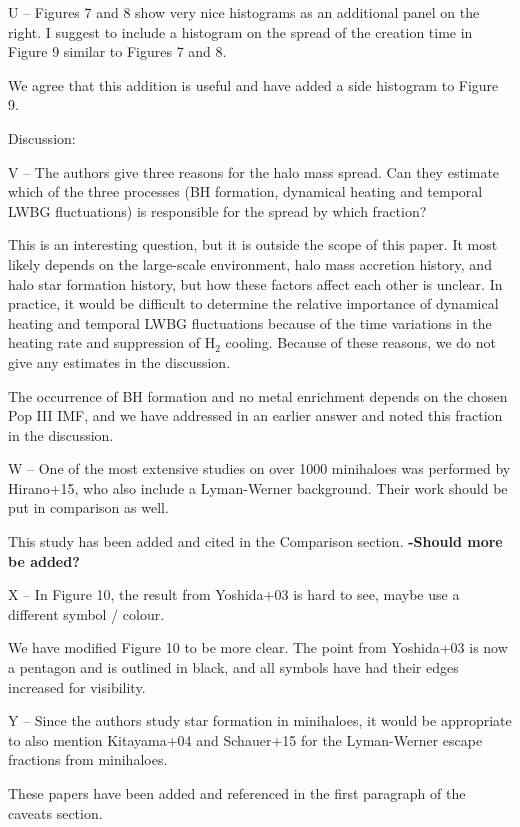 \documentclass[11pt]{article}
\newenvironment{referee}[1][]{%
    \ignorespaces%
    \begin{mdframed}[style=myquotestyle,#1]%
}{%
    \end{mdframed}%
    \ignorespacesafterend%
}%
\begin{document}
\begin{referee}
U -- Figures 7 and 8 show very nice histograms as an additional panel on the right.  I suggest to include a histogram on the spread of the creation time in Figure 9 similar to Figures 7 and 8.
\end{referee}
We agree that this addition is useful and have added a side histogram to Figure 9. 

\begin{referee}
Discussion:

V -- The authors give three reasons for the halo mass spread. Can they estimate which of the three processes (BH formation, dynamical heating and temporal LWBG fluctuations) is responsible for the spread by which fraction?
\end{referee}

This is an interesting question, but it is outside the scope of this paper.  It most likely depends on the large-scale environment, halo mass accretion history, and halo star formation history, but how these factors affect each other is unclear.  In practice, it would be difficult to determine the relative importance of dynamical heating and temporal LWBG fluctuations because of the time variations in the heating rate and suppression of H$_2$ cooling.  Because of these reasons, we do not give any estimates in the discussion.

The occurrence of BH formation and no metal enrichment depends on the chosen Pop III IMF, and we have addressed in an earlier answer and noted this fraction in the discussion.

\begin{referee}
W -- One of the most extensive studies on over 1000 minihaloes was performed by Hirano+15, who also include a Lyman-Werner background. Their work should be put in comparison as well.
\end{referee}
This study has been added and cited in the Comparison section.
\textbf{-Should more be added?}

\begin{referee}
X -- In Figure 10, the result from Yoshida+03 is hard to see, maybe use a different symbol / colour.
\end{referee}
We have modified Figure 10 to be more clear. The point from Yoshida+03 is now a pentagon and is outlined in black, and all symbols have had their edges increased for visibility.

\begin{referee}
Y -- Since the authors study star formation in minihaloes, it would be appropriate to also mention Kitayama+04 and Schauer+15 for the Lyman-Werner escape fractions from minihaloes.
\end{referee}
These papers have been added and referenced in the first paragraph of the caveats section. 
\end{document}
